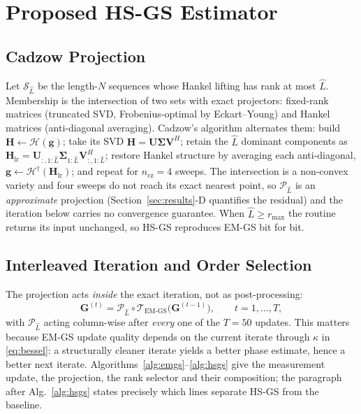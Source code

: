 \documentclass[conference]{IEEEtran}
\newcommand{\bG}{\mathbf{G}}
\newcommand{\bH}{\mathbf{H}}
\newcommand{\bU}{\mathbf{U}}
\newcommand{\bg}{\mathbf{g}}
\newcommand{\Hank}{\mathcal{H}}
\begin{document}
\section{Proposed HS-GS Estimator}\label{sec:method}
\subsection{Cadzow Projection}
Let $\mathcal{S}_{\hat L}$ be the length-$N$ sequences whose Hankel lifting
has rank at most $\hat L$. Membership is the intersection of two sets with
exact projectors: fixed-rank matrices (truncated SVD, Frobenius-optimal by
Eckart--Young) and Hankel matrices (anti-diagonal averaging). Cadzow's algorithm \cite{cadzow1988} alternates them: build
$\bH\leftarrow\Hank(\bg)$; take its SVD
$\bH=\bU\boldsymbol{\Sigma}\mathbf{V}^{H}$; retain the $\hat L$ dominant
components as $\bH_{\mathrm{lr}}=\bU_{:,1:\hat L}\boldsymbol{\Sigma}_{1:\hat L}\mathbf{V}_{:,1:\hat L}^{H}$; restore Hankel structure by averaging each
anti-diagonal, $\bg\leftarrow\Hank^{\dagger}(\bH_{\mathrm{lr}})$; and repeat
for $n_{\mathrm{cz}}=4$ sweeps.
The intersection is a non-convex variety and four sweeps do not reach its exact
nearest point, so $\mathcal{P}_{\hat L}$ is an \emph{approximate} projection
(Section~\ref{sec:results}-D quantifies the residual) and the iteration below
carries no convergence guarantee. When $\hat L\ge r_{\max}$ the routine returns
its input unchanged, so HS-GS reproduces EM-GS bit for bit.

\subsection{Interleaved Iteration and Order Selection}
The projection acts \emph{inside} the exact iteration, not as post-processing:
\begin{equation}\label{eq:map}
\bG^{(t)}=\mathcal{P}_{\hat L}\circ\mathcal{T}_{\mathrm{EM\text{-}GS}}
\bigl(\bG^{(t-1)}\bigr),\qquad t=1,\dots,T,
\end{equation}
with $\mathcal{P}_{\hat L}$ acting column-wise after \emph{every} one of the
$T=50$ updates. This matters because EM-GS update quality depends on the
current iterate through $\kappa$ in \eqref{eq:bessel}: a structurally cleaner
iterate yields a better phase estimate, hence a better next iterate.
Algorithms~\ref{alg:emgs}--\ref{alg:hsgs} give the measurement update, the
projection, the rank selector and their composition; the paragraph after
Alg.~\ref{alg:hsgs} states precisely which lines separate HS-GS from the
baseline.
\end{document}
